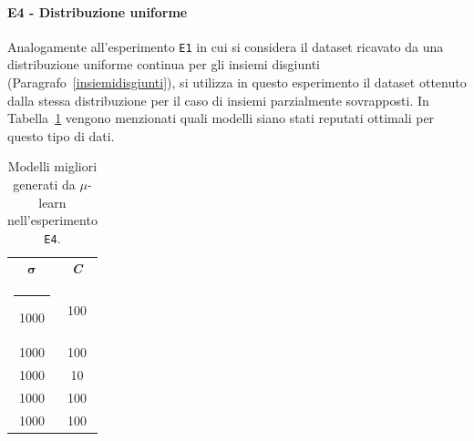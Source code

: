 \documentclass[12pt]{report}
\makeatletter
\theoremstyle{definition}
\newcommand{\thickhline}{%
    \noalign {\ifnum 0=`}\fi \hrule height 1pt
    \futurelet \reserved@a \@xhline
}
\makeatother
\begin{document}
\paragraph{E4 - Distribuzione uniforme} Analogamente all'esperimento \texttt{E1} in cui si considera il dataset ricavato da una distribuzione uniforme continua per gli insiemi disgiunti (Paragrafo~\ref{insiemidisgiunti}), si utilizza in questo esperimento il dataset ottenuto dalla stessa distribuzione per il caso di insiemi parzialmente sovrapposti. In Tabella~\ref{models_exp4} vengono menzionati quali modelli siano stati reputati ottimali per questo tipo di dati.
\begin{table}
\centering
\begin{adjustbox}{max width=\textwidth}
 \begin{tabular}{|c|c|} 
 \hline
$\bm{\sigma}$ & \textit{\textbf{C}}
\\ [0.5ex] 
 \thickhline
 1000 & 100 \\
 1000 & 100 \\
 1000 & 10 \\
 1000 & 100 \\
 1000 & 100 \\
 \hline
\end{tabular}
\end{adjustbox}
\caption{Modelli migliori generati da $\mu$-learn nell'esperimento \texttt{E4}.}
\label{models_exp4}
\end{table}
\end{document}
